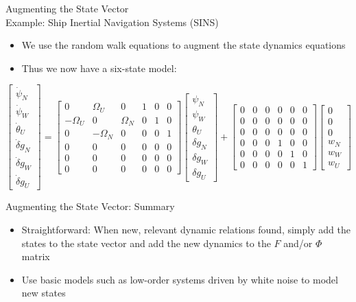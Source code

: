 \begin{frame}
Augmenting the State Vector\\
Example: Ship Inertial Navigation Systems (SINS)
\begin{itemize}
  \item We use the random walk equations to augment the state dynamics equations
  \item Thus we now have a six-state model:
\end{itemize} 
\[
\begin{bmatrix}
\dot{\psi}_N\\
\dot{\psi}_W\\
\dot{\theta}_U\\
\dot{\delta} g_N\\
\dot{\delta} g_W\\
\dot{\delta} g_U
\end{bmatrix}
=
\begin{bmatrix}
0&\Omega_U&0&1&0&0\\
-\Omega_U&0&\Omega_N&0&1&0\\
0&-\Omega_N&0&0&0&1\\
0&0&0&0&0&0\\
0&0&0&0&0&0\\
0&0&0&0&0&0
\end{bmatrix}
\begin{bmatrix}
\psi_N\\
\psi_W\\
\theta_U\\
\delta g_N\\
\delta g_W\\
\delta g_U
\end{bmatrix}
+\begin{bmatrix}
0&0&0&0&0&0\\
0&0&0&0&0&0\\
0&0&0&0&0&0\\
0&0&0&1&0&0\\
0&0&0&0&1&0\\
0&0&0&0&0&1
\end{bmatrix}
\begin{bmatrix}
0\\
0\\
0\\
w_N\\
w_W\\
w_U
\end{bmatrix}
\]
\end{frame}
\begin{frame}
Augmenting the State Vector:  Summary
\begin{itemize}
  \item Straightforward: When new, relevant dynamic relations found, simply add the states to the state vector and add the new dynamics to the $F$ and/or $\Phi$ matrix
  \item Use basic models such as low-order systems driven by white noise to model new states
\end{itemize}
\end{frame}
